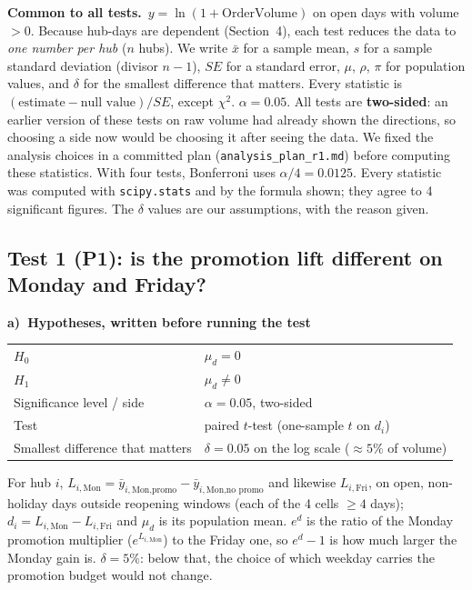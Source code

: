 \documentclass[10pt,a4paper,twocolumn]{article}
\newcommand{\key}[1]{\textbf{\textcolor{keyblue}{#1}}}
\newcommand{\field}[2]{\key{#1}~#2\par}
\newcommand{\tpart}[2]{\par\needspace{12\baselineskip}\smallskip\key{#1)~#2}\par}
\newcommand{\code}[1]{\texttt{#1}}
\begin{document}
\field{Common to all tests.}{$y=\ln(1+\text{OrderVolume})$ on open days with volume $>0$. Because hub-days are
dependent (Section~4), each test reduces the data to \emph{one number per hub} ($n$ hubs). We write $\bar x$ for a
sample mean, $s$ for a sample standard deviation (divisor $n-1$), $SE$ for a standard error, $\mu$, $\rho$, $\pi$ for
population values, and $\delta$ for the smallest difference that matters. Every statistic is $(\text{estimate}-\text{null
value})/SE$, except $\chi^2$. $\alpha=0.05$. All tests are \textbf{two-sided}: an earlier version of these tests on raw
volume had already shown the directions, so choosing a side now would be choosing it after seeing the data. We fixed the
analysis choices in a committed plan (\code{analysis\_plan\_r1.md}) before computing these statistics. With four tests,
Bonferroni uses $\alpha/4=0.0125$. Every statistic was computed with \code{scipy.stats} and by the formula shown;
they agree to 4 significant figures. The $\delta$ values are our assumptions, with the reason given.}

\subsection*{Test 1 (P1): is the promotion lift different on Monday and Friday?}

\tpart{a}{Hypotheses, written before running the test}
{\small
\begin{tabularx}{\linewidth}{@{}K{3.4cm} Y@{}}
\toprule
$H_0$ & $\mu_d=0$ \\
$H_1$ & $\mu_d\neq0$ \\
Significance level / side & $\alpha=0.05$, two-sided \\
Test & paired $t$-test (one-sample $t$ on $d_i$) \\
Smallest difference that matters & $\delta=0.05$ on the log scale ($\approx5\%$ of volume) \\
\bottomrule
\end{tabularx}}

For hub $i$, $L_{i,\text{Mon}}=\bar y_{i,\text{Mon,promo}}-\bar y_{i,\text{Mon,no promo}}$ and likewise $L_{i,\text{Fri}}$,
on open, non-holiday days outside reopening windows (each of the 4 cells $\ge4$ days); $d_i=L_{i,\text{Mon}}-L_{i,\text{Fri}}$
and $\mu_d$ is its population mean. $e^{d}$ is the ratio of the Monday promotion multiplier ($e^{L_{i,\text{Mon}}}$) to the Friday one, so $e^{d}-1$ is how much larger the Monday gain is. $\delta=5\%$:
below that, the choice of which weekday carries the promotion budget would not change.
\end{document}
